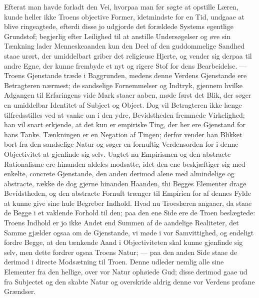 \documentclass[12pt]{book}
\newcommand{\opage}[1]{\marginnote{\footnotesize\textit{[#1]}}}
\begin{document}
Efterat man havde forladt den Vei, hvorpaa man før søgte at opstille Læren,
kunde heller ikke Troens objective Former, idetmindste for en Tid, undgaae at
blive ringeagtede, efterdi disse jo udgjorde det forældede Systems egentlige
Grundstof; begjerlig efter Leilighed til at anstille Undersøgelser og øve sin
Tænkning lader Menneskeaanden kun den Deel af den guddommelige Sandhed staae
urørt, der umiddelbart griber det religieuse Hjerte, og vender sig derpaa til
andre Egne, der kunne frembyde et nyt og rigere Stof for dens Bearbeidelse.
--- Troens Gjenstande træde i Baggrunden, medens denne Verdens Gjenstande ere
Betragteren nærmest; de sandselige Fornemmelser og Indtryk, gjennem
\opage{88} %
hvilke Adgangen til Erfaringens vide Mark staaer aaben, møde først det Blik,
der søger en umiddelbar Identitet af Subject og Object. Dog vil Betragteren
ikke længe tilfredsstilles ved at vanke om i den ydre, Bevidstheden fremmede
Virkelighed; han vil snart erkjende, at det kun er empiriske Ting, der her ere
Gjenstand for hans Tanke. Tænkningen er en Negation af Tingen; derfor vender
han Blikket bort fra den sandselige Natur og søger en fornuftig Verdensorden
for i denne Objectivitet at gjenfinde sig selv. Uagtet nu Empirismen og den
abstracte Rationalisme ere hinanden aldeles modsatte, idet den ene beskjæftiger
sig med enkelte, concrete Gjenstande, den anden derimod alene med almindelige
og abstracte, række de dog gjerne hinanden Haanden, thi Begges Elementer drage
Bevidstheden, og den abstracte Fornuft trænger til Empirien for af dennes Fylde
at kunne give sine hule Begreber Indhold. Hvad nu Troeslæren angaaer, da staae
de Begge i et vaklende Forhold til den; paa den ene Side ere de Troen
beslægtede: Troens Indhold er jo ikke Andet end Summen af de aandelige
Realiteter, det Samme gjælder ogsaa om de Gjenstande, vi møde i vor
Samvittighed, og endeligt fordre Begge, at den tænkende Aand i Objectiviteten
skal kunne gjenfinde sig selv, men dette fordrer ogsaa Troens Natur; --- paa
den anden Side staae de derimod i directe Modsætning til Troen. Denne udleder
nemlig alle sine Elementer fra den hellige, over vor Natur ophøiede Gud; disse
derimod gaae ud fra Subjectet og den skabte Natur og overskride aldrig denne
vor Verdens profane Grændser.
\end{document}
